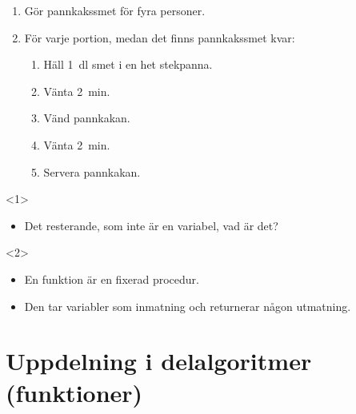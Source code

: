 \begin{frame}
  \begin{example}
    \begin{enumerate}
      \item \alert<2>{Gör pannkakssmet för fyra personer.}
      \item För varje portion, medan det finns pannkakssmet kvar:
        \begin{enumerate}
          \item Häll \SI{1}{\deci\litre} smet i en het stekpanna.
          \item Vänta \SI{2}{\minute}.
          \item Vänd pannkakan.
          \item Vänta \SI{2}{\minute}.
          \item Servera pannkakan.
        \end{enumerate}
    \end{enumerate}
  \end{example}

  \begin{onlyenv}<1>
    \begin{exercise}
      \begin{itemize}
        \item Det resterande, som inte är en variabel, vad är det?
      \end{itemize}
    \end{exercise}
  \end{onlyenv}
  
  \begin{onlyenv}<2>
    \begin{definition}[Funktion]
      \begin{itemize}
        \item En funktion är en fixerad procedur.
        \item Den tar variabler som inmatning och returnerar någon 
          utmatning.
      \end{itemize}
    \end{definition}
  \end{onlyenv}
\end{frame}

\section{Uppdelning i delalgoritmer (funktioner)}

